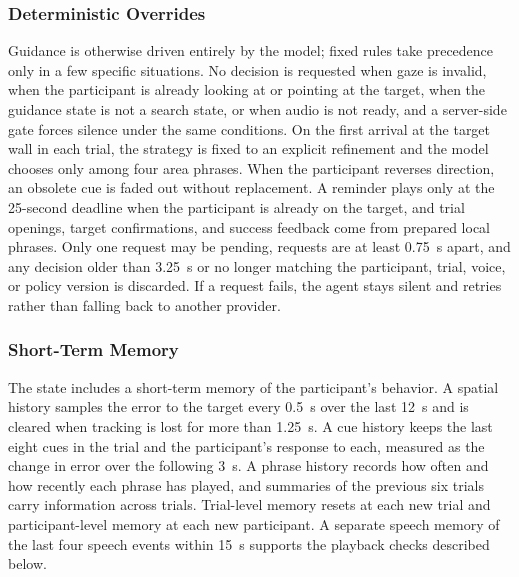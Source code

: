 \subsubsection{Deterministic Overrides}
\label{sec:overrides}
Guidance is otherwise driven entirely by the model; fixed rules take precedence only in a few specific situations. No decision is requested when gaze is invalid, when the participant is already looking at or pointing at the target, when the guidance state is not a search state, or when audio is not ready, and a server-side gate forces silence under the same conditions. On the first arrival at the target wall in each trial, the strategy is fixed to an explicit refinement and the model chooses only among four area phrases. When the participant reverses direction, an obsolete cue is faded out without replacement. A reminder plays only at the 25-second deadline when the participant is already on the target, and trial openings, target confirmations, and success feedback come from prepared local phrases. Only one request may be pending, requests are at least 0.75~s apart, and any decision older than 3.25~s or no longer matching the participant, trial, voice, or policy version is discarded. If a request fails, the agent stays silent and retries rather than falling back to another provider.

\subsubsection{Short-Term Memory}
The state includes a short-term memory of the participant's behavior. A spatial history samples the error to the target every 0.5~s over the last 12~s and is cleared when tracking is lost for more than 1.25~s. A cue history keeps the last eight cues in the trial and the participant's response to each, measured as the change in error over the following 3~s. A phrase history records how often and how recently each phrase has played, and summaries of the previous six trials carry information across trials. Trial-level memory resets at each new trial and participant-level memory at each new participant. A separate speech memory of the last four speech events within 15~s supports the playback checks described below.

